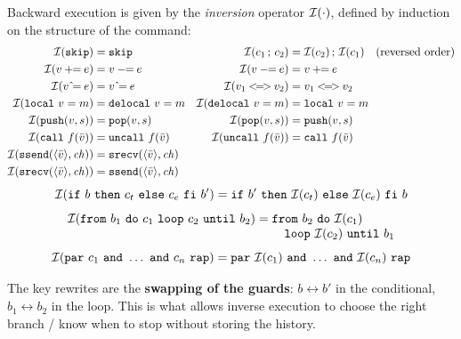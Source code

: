 Backward execution is given by the \emph{inversion} operator
$\mathcal{I}(\cdot)$, defined by induction on the structure of the command:
{\small
\begin{align*}
\Inv{\mathtt{skip}} &= \mathtt{skip} &
\Inv{c_1\,;\,c_2} &= \Inv{c_2}\,;\,\Inv{c_1} \quad \text{(reversed order)}\\
\Inv{v \mathbin{+\!\!=} e} &= v \mathbin{-\!\!=} e &
\Inv{v \mathbin{-\!\!=} e} &= v \mathbin{+\!\!=} e \\
\Inv{v \mathbin{\hat{}\!=} e} &= v \mathbin{\hat{}\!=} e &
\Inv{v_1 \mathbin{<\!=\!>} v_2} &= v_1 \mathbin{<\!=\!>} v_2 \\
\Inv{\mathtt{local}\ v = m} &= \mathtt{delocal}\ v = m &
\Inv{\mathtt{delocal}\ v = m} &= \mathtt{local}\ v = m \\
\Inv{\mathtt{push}(v,s)} &= \mathtt{pop}(v,s) &
\Inv{\mathtt{pop}(v,s)} &= \mathtt{push}(v,s) \\
\Inv{\mathtt{call}\ f(\bar v)} &= \mathtt{uncall}\ f(\bar v) &
\Inv{\mathtt{uncall}\ f(\bar v)} &= \mathtt{call}\ f(\bar v) \\
\Inv{\mathtt{ssend}(\langle \bar v \rangle, \mathit{ch})} &= \mathtt{srecv}(\langle \bar v \rangle, \mathit{ch}) \\
\Inv{\mathtt{srecv}(\langle \bar v \rangle, \mathit{ch})} &= \mathtt{ssend}(\langle \bar v \rangle, \mathit{ch})
\end{align*}
}
\[
\Inv{\mathtt{if}\ b\ \mathtt{then}\ c_t\ \mathtt{else}\ c_e\ \mathtt{fi}\ b'}
   = \mathtt{if}\ b'\ \mathtt{then}\ \Inv{c_t}\ \mathtt{else}\ \Inv{c_e}\ \mathtt{fi}\ b
\]
\[
\Inv{\mathtt{from}\ b_1\ \mathtt{do}\ c_1\ \mathtt{loop}\ c_2\ \mathtt{until}\ b_2}
   = \begin{array}[t]{@{}l@{}}\mathtt{from}\ b_2\ \mathtt{do}\ \Inv{c_1}\\ \quad\mathtt{loop}\ \Inv{c_2}\ \mathtt{until}\ b_1\end{array}
\]
\[
\Inv{\mathtt{par}\ c_1\ \mathtt{and}\ \dots\ \mathtt{and}\ c_n\ \mathtt{rap}}
   = \mathtt{par}\ \Inv{c_1}\ \mathtt{and}\ \dots\ \mathtt{and}\ \Inv{c_n}\ \mathtt{rap}
\]

\noindent
The key rewrites are the \textbf{swapping of the guards}: $b \leftrightarrow b'$
in the conditional, $b_1 \leftrightarrow b_2$ in the loop. This is what allows
inverse execution to choose the right branch / know when to stop
without storing the history.

